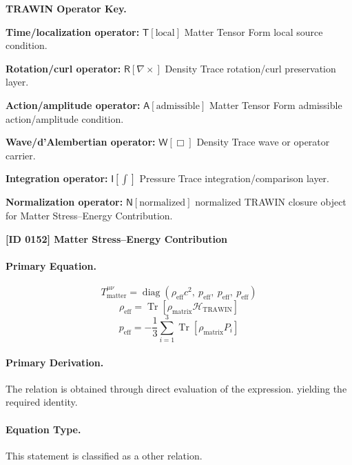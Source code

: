 \par\vspace{0.45\baselineskip}
\noindent\begin{minipage}[t]{\linewidth}
\begingroup
\small
\raggedright
\textbf{TRAWIN Operator Key.}\par
\noindent\textbf{Time/localization operator:} $\mathsf{T}\!\left[\mathrm{local}\right]$ Matter Tensor Form local source condition.\par
\noindent\textbf{Rotation/curl operator:} $\mathsf{R}\!\left[\nabla\times\right]$ Density Trace rotation/curl preservation layer.\par
\noindent\textbf{Action/amplitude operator:} $\mathsf{A}\!\left[\mathrm{admissible}\right]$ Matter Tensor Form admissible action/amplitude condition.\par
\noindent\textbf{Wave/d'Alembertian operator:} $\mathsf{W}\!\left[\Box\right]$ Density Trace wave or operator carrier.\par
\noindent\textbf{Integration operator:} $\mathsf{I}\!\left[\int\right]$ Pressure Trace integration/comparison layer.\par
\noindent\textbf{Normalization operator:} $\mathsf{N}\!\left[\mathrm{normalized}\right]$ normalized TRAWIN closure object for Matter Stress--Energy Contribution.\par
\endgroup
\end{minipage}

\clearpage
\noindent\textbf{[ID 0152] Matter Stress--Energy Contribution}\par
\vspace{0.35em}
\paragraph{Primary Equation.}
\[
T_{\mathrm{matter}}^{\mu\nu}
=
\operatorname{diag}\!\left(
\rho_{\mathrm{eff}}c^2,\ p_{\mathrm{eff}},\ p_{\mathrm{eff}},\ p_{\mathrm{eff}}
\right)
\]
\[
\rho_{\mathrm{eff}}
=
\operatorname{Tr}\!\left[\rho_{\mathrm{matrix}}\mathcal{H}_{\mathrm{TRAWIN}}\right]
\]
\[
p_{\mathrm{eff}}
=
-\frac{1}{3}\sum_{i=1}^{3}\operatorname{Tr}\!\left[\rho_{\mathrm{matrix}}P_i\right]
\]

\paragraph{Primary Derivation.}
The relation is obtained through direct evaluation of the expression. yielding the required identity.
\paragraph{Equation Type.}
This statement is classified as a other relation.

